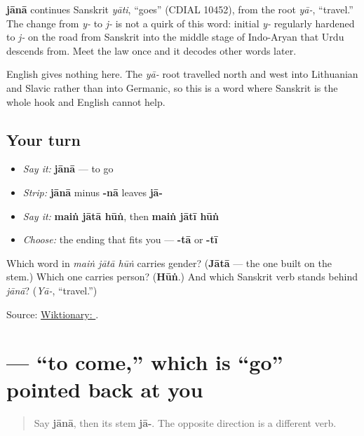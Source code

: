 \begin{cousinweb}
\textbf{jānā} continues Sanskrit \emph{yāti}, “goes” (CDIAL 10452), from the root \emph{yā-}, “travel.” The change from \emph{y-} to \emph{j-} is not a quirk of this word: initial \emph{y-} regularly hardened to \emph{j-} on the road from Sanskrit into the middle stage of Indo-Aryan that Urdu descends from. Meet the law once and it decodes other words later.

English gives nothing here. The \emph{yā-} root travelled north and west into Lithuanian and Slavic rather than into Germanic, so this is a word where Sanskrit is the whole hook and English cannot help.
\end{cousinweb}

\subsection*{Your turn}
\begin{itemize}
\raggedright
  \item \emph{Say it:} \textbf{jānā} — to go
  \item \emph{Strip:} \textbf{jānā} minus \textbf{-nā} leaves \textbf{jā-}
  \item \emph{Say it:} \textbf{maiṅ jātā hūṅ}, then \textbf{maiṅ jātī hūṅ}
  \item \emph{Choose:} the ending that fits you — \textbf{-tā} or \textbf{-tī}
\end{itemize}

\begin{tcolorbox}[breakable,colback=teal!4,colframe=teal!35!black,title={Before you move on}]
Which word in \emph{maiṅ jātā hūṅ} carries gender? (\textbf{Jātā} — the one built on the stem.) Which one carries person? (\textbf{Hūṅ}.) And which Sanskrit verb stands behind \emph{jānā}? (\emph{Yā-}, “travel.”)

Source: \href{https://en.wiktionary.org/wiki/\%D8\%AC\%D8\%A7\%D9\%86\%D8\%A7\#Urdu}{Wiktionary: }.
\end{tcolorbox}
\section[\texorpdfstring{\ur{آنا} (ānā)}{آنا (ānā)}]{ — “to come,” which is “go” pointed back at you}

\label{lesson:UR-C06-ana}



\begin{quote}
Say \textbf{jānā}, then its stem \textbf{jā-}. The opposite direction is a different verb.
\end{quote}

